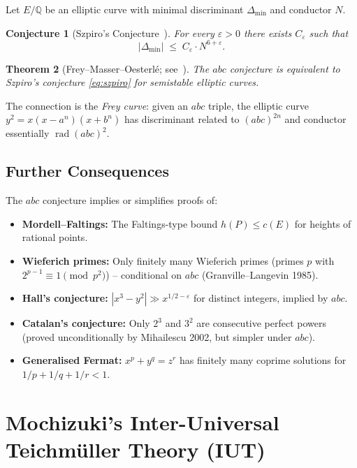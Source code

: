 \documentclass[12pt,a4paper]{article}
\newtheorem{theorem}{Theorem}[section]
\newtheorem{conjecture}[theorem]{Conjecture}
\theoremstyle{remark}
\begin{document}
Let $E/\mathbb{Q}$ be an elliptic curve with minimal discriminant $\Delta_{\min}$ and
conductor $N$.

\begin{conjecture}[Szpiro's Conjecture~\cite{Szpiro1981}]
  For every $\varepsilon>0$ there exists $C_\varepsilon$ such that
  \begin{equation}\label{eq:szpiro}
    |\Delta_{\min}| \;\leq\; C_\varepsilon \cdot N^{6+\varepsilon}.
  \end{equation}
\end{conjecture}

\begin{theorem}[Frey--Masser--Oesterlé; see~\cite{Silverman1994}]
  The $abc$ conjecture is equivalent to Szpiro's conjecture \eqref{eq:szpiro} for
  semistable elliptic curves.
\end{theorem}

The connection is the \emph{Frey curve}: given an $abc$ triple, the elliptic curve
$y^2 = x(x-a^n)(x+b^n)$ has discriminant related to $(abc)^{2n}$ and conductor
essentially $\operatorname{rad}(abc)^2$.

\subsection{Further Consequences}

The $abc$ conjecture implies or simplifies proofs of:
\begin{itemize}[nosep]
  \item \textbf{Mordell--Faltings:} The Faltings-type bound $h(P)\leq c(E)$
    for heights of rational points.
  \item \textbf{Wieferich primes:} Only finitely many Wieferich primes
    (primes $p$ with $2^{p-1}\equiv1\pmod{p^2}$) -- conditional on $abc$
    (Granville--Langevin 1985).
  \item \textbf{Hall's conjecture:} $|x^3 - y^2| \gg x^{1/2 - \varepsilon}$
    for distinct integers, implied by $abc$.
  \item \textbf{Catalan's conjecture:} Only $2^3$ and $3^2$ are consecutive perfect powers
    (proved unconditionally by Mihailescu 2002, but simpler under $abc$).
  \item \textbf{Generalised Fermat:} $x^p + y^q = z^r$ has finitely many coprime
    solutions for $1/p+1/q+1/r < 1$.
\end{itemize}

\section{Mochizuki's Inter-Universal Teichmüller Theory (IUT)}
\end{document}
